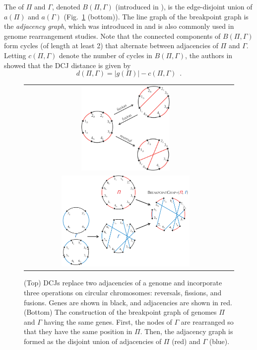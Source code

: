 The  of $\Pi$ and $\Gamma$, denoted $B(\Pi, \Gamma)$ (introduced in \cite{bafna}), is the edge-disjoint union of $a(\Pi)$ and $a(\Gamma)$ (Fig.~\ref{figure:DCJ_breakpoint_graph} (bottom)).  The line graph of the breakpoint graph is the {\em adjacency graph}, which was introduced in \cite{bergeron} and is also commonly used in genome rearrangement studies.  Note that the connected components of $B(\Pi, \Gamma)$ form cycles (of length at least 2) that alternate between adjacencies of $\Pi$ and $\Gamma$. Letting $c(\Pi, \Gamma)$ denote the number of cycles in $B(\Pi, \Gamma)$, the authors in \cite{yancopoulos} showed that the DCJ distance is given by
\begin{equation}
d(\Pi, \Gamma) = |g(\Pi)| - c(\Pi, \Gamma)\enspace.
\end{equation}

\begin{figure}[h]
\centering
\begin{tabular}{c c}
\includegraphics[width = 0.45\textwidth]{images/wabi2014/reversal_fission_and_fusion}\\[5ex]
\includegraphics[width = 0.65\textwidth]{images/wabi2014/breakpoint_graph}
\end{tabular}
\label{figure:DCJ_breakpoint_graph}
\caption{(Top) DCJs replace two adjacencies of a genome and incorporate three operations on circular chromosomes: reversals, fissions, and fusions. Genes are shown in black, and adjacencies are shown in red. (Bottom) The construction of the breakpoint graph of genomes $\Pi$ and $\Gamma$ having the same genes. First, the nodes of $\Gamma$ are rearranged so that they have the same position in $\Pi$.  Then, the adjacency graph is formed as the disjoint union of adjacencies of $\Pi$ (red) and $\Gamma$ (blue).}
\end{figure}

